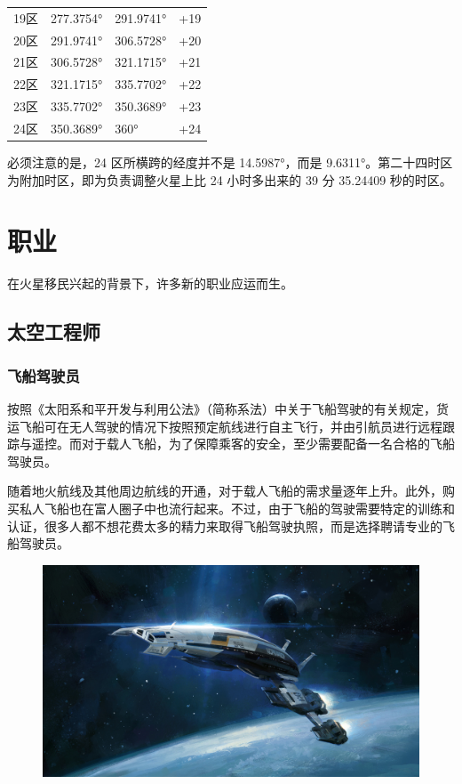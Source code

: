 \documentclass[letterpaper,10pt]{sphinxmanual}
\begin{document}
\begin{threeparttable}
\begin{tabulary}{\linewidth}{|L|L|L|L|}
19区
 & 
277.3754°
 & 
291.9741°
 & 
+19
\\

20区
 & 
291.9741°
 & 
306.5728°
 & 
+20
\\

21区
 & 
306.5728°
 & 
321.1715°
 & 
+21
\\

22区
 & 
321.1715°
 & 
335.7702°
 & 
+22
\\

23区
 & 
335.7702°
 & 
350.3689°
 & 
+23
\\

24区
 & 
350.3689°
 & 
360°
 & 
+24
\\
\hline\end{tabulary}

\end{threeparttable}


必须注意的是，24 区所横跨的经度并不是 14.5987°，而是 9.6311°。第二十四时区为附加时区，即为负责调整火星上比 24 小时多出来的 39 分 35.24409 秒的时区。


\section{职业}
\label{profession::doc}\label{profession:id1}
在火星移民兴起的背景下，许多新的职业应运而生。


\subsection{太空工程师}
\label{profession:id2}

\subsubsection{飞船驾驶员}
\label{profession:id3}
按照《太阳系和平开发与利用公法》（简称系法）中关于飞船驾驶的有关规定，货运飞船可在无人驾驶的情况下按照预定航线进行自主飞行，并由引航员进行远程跟踪与遥控。而对于载人飞船，为了保障乘客的安全，至少需要配备一名合格的飞船驾驶员。

随着地火航线及其他周边航线的开通，对于载人飞船的需求量逐年上升。此外，购买私人飞船也在富人圈子中也流行起来。不过，由于飞船的驾驶需要特定的训练和认证，很多人都不想花费太多的精力来取得飞船驾驶执照，而是选择聘请专业的飞船驾驶员。
\begin{figure}[htbp]
\centering

\includegraphics{290500.jpg}
\end{figure}
\end{document}
